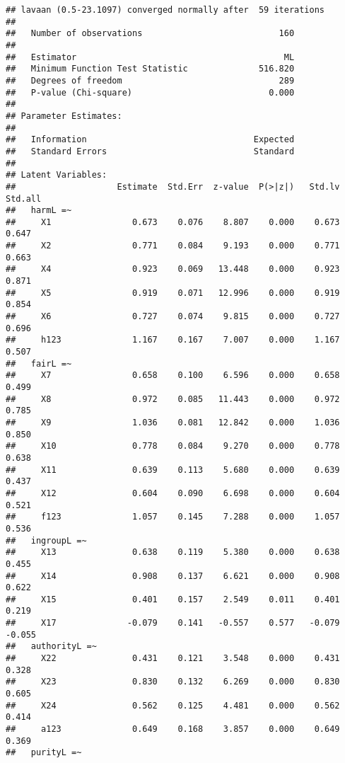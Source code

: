 \documentclass[english,man]{apa6}
\newcounter{author}
\theoremstyle{definition}
\theoremstyle{definition}
\theoremstyle{definition}
\theoremstyle{remark}
\begin{document}
\begin{verbatim}
## lavaan (0.5-23.1097) converged normally after  59 iterations
## 
##   Number of observations                           160
## 
##   Estimator                                         ML
##   Minimum Function Test Statistic              516.820
##   Degrees of freedom                               289
##   P-value (Chi-square)                           0.000
## 
## Parameter Estimates:
## 
##   Information                                 Expected
##   Standard Errors                             Standard
## 
## Latent Variables:
##                    Estimate  Std.Err  z-value  P(>|z|)   Std.lv  Std.all
##   harmL =~                                                              
##     X1                0.673    0.076    8.807    0.000    0.673    0.647
##     X2                0.771    0.084    9.193    0.000    0.771    0.663
##     X4                0.923    0.069   13.448    0.000    0.923    0.871
##     X5                0.919    0.071   12.996    0.000    0.919    0.854
##     X6                0.727    0.074    9.815    0.000    0.727    0.696
##     h123              1.167    0.167    7.007    0.000    1.167    0.507
##   fairL =~                                                              
##     X7                0.658    0.100    6.596    0.000    0.658    0.499
##     X8                0.972    0.085   11.443    0.000    0.972    0.785
##     X9                1.036    0.081   12.842    0.000    1.036    0.850
##     X10               0.778    0.084    9.270    0.000    0.778    0.638
##     X11               0.639    0.113    5.680    0.000    0.639    0.437
##     X12               0.604    0.090    6.698    0.000    0.604    0.521
##     f123              1.057    0.145    7.288    0.000    1.057    0.536
##   ingroupL =~                                                           
##     X13               0.638    0.119    5.380    0.000    0.638    0.455
##     X14               0.908    0.137    6.621    0.000    0.908    0.622
##     X15               0.401    0.157    2.549    0.011    0.401    0.219
##     X17              -0.079    0.141   -0.557    0.577   -0.079   -0.055
##   authorityL =~                                                         
##     X22               0.431    0.121    3.548    0.000    0.431    0.328
##     X23               0.830    0.132    6.269    0.000    0.830    0.605
##     X24               0.562    0.125    4.481    0.000    0.562    0.414
##     a123              0.649    0.168    3.857    0.000    0.649    0.369
##   purityL =~                                                            

\end{verbatim}
\end{document}
